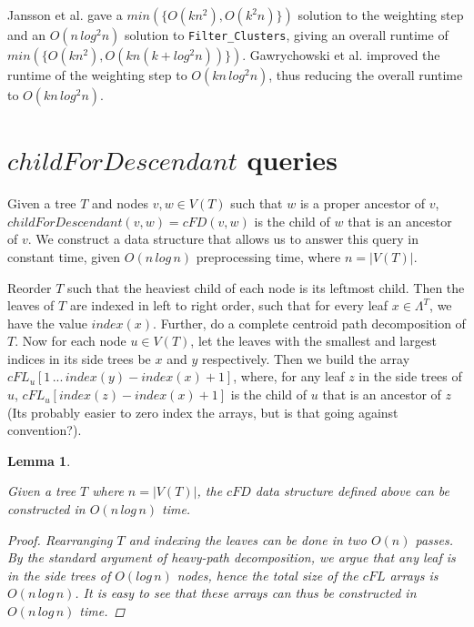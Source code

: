 \documentclass{article}
\newcommand{\leafset}{\Lambda}
\newtheorem{cfddatastructure}[incompatibility]{Lemma}
\begin{document}
    Jansson et al. \cite{jansson2018algorithms} gave a $min(\{O(kn^2), O(k^2n)\})$ solution to the weighting step and an $O(n\,log^2n)$ solution to \texttt{Filter\_Clusters}, giving an overall runtime of $min(\{O(kn^2), O(kn(k + log^2n))\})$. Gawrychowski et al. \cite{gawrychowski2017faster} improved the runtime of the weighting step to $O(kn\,log^2n)$, thus reducing the overall runtime to $O(kn\,log^2n)$.

    \section{$childForDescendant$ queries}
    \label{sec:cfd}

    Given a tree $T$ and nodes $v, w \in V(T)$ such that $w$ is a proper ancestor of $v$, $childForDescendant(v, w) = cFD(v, w)$ is the child of $w$ that is an ancestor of $v$. We construct a data structure that allows us to answer this query in constant time, given $O(n\,log\,n)$ preprocessing time, where $n = |V(T)|$.

    Reorder $T$ such that the heaviest child of each node is its leftmost child. Then the leaves of $T$ are indexed in left to right order, such that for every leaf $x \in \leafset^T$, we have the value $index(x)$. Further, do a complete centroid path decomposition of $T$. Now for each node $u \in V(T)$, let the leaves with the smallest and largest indices in its side trees be $x$ and $y$ respectively. Then we build the array $cFL_u[1\, ...\, index(y) - index(x) + 1]$, where, for any leaf $z$ in the side trees of $u$, $cFL_u[index(z) - index(x) + 1]$ is the child of $u$ that is an ancestor of $z$ {\color{red} (Its probably easier to zero index the arrays, but is that going against convention?)}.
    \newline

    \begin{cfddatastructure}
        \label{lem:cfddatastructure}

        Given a tree $T$ where $n = |V(T)|$, the $cFD$ data structure defined above can be constructed in $O(n\,log\,n)$ time.

        \begin{proof}
            Rearranging $T$ and indexing the leaves can be done in two $O(n)$ passes. By the standard argument of heavy-path decomposition, we argue that any leaf is in the side trees of $O(log\,n)$ nodes, hence the total size of the $cFL$ arrays is $O(n\,log\,n)$. It is easy to see that these arrays can thus be constructed in $O(n\,log\,n)$ time.
        \end{proof}
    \end{cfddatastructure}
\end{document}
